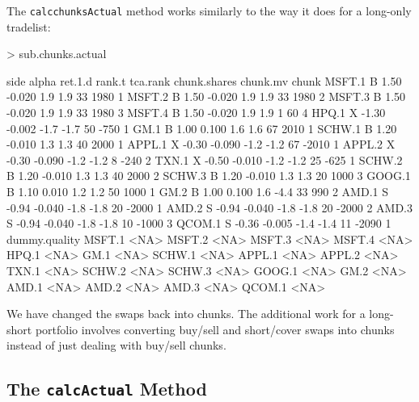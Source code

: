 \documentclass{article}
\begin{document}
The \texttt{calcchunksActual} method works similarly to the way it
does for a long-only tradelist:


\begin{Schunk}
\begin{Sinput}
> sub.chunks.actual
\end{Sinput}
\begin{Soutput}
       side alpha ret.1.d rank.t tca.rank chunk.shares chunk.mv chunk
MSFT.1    B  1.50  -0.020    1.9      1.9           33     1980     1
MSFT.2    B  1.50  -0.020    1.9      1.9           33     1980     2
MSFT.3    B  1.50  -0.020    1.9      1.9           33     1980     3
MSFT.4    B  1.50  -0.020    1.9      1.9            1       60     4
HPQ.1     X -1.30  -0.002   -1.7     -1.7           50     -750     1
GM.1      B  1.00   0.100    1.6      1.6           67     2010     1
SCHW.1    B  1.20  -0.010    1.3      1.3           40     2000     1
APPL.1    X -0.30  -0.090   -1.2     -1.2           67    -2010     1
APPL.2    X -0.30  -0.090   -1.2     -1.2            8     -240     2
TXN.1     X -0.50  -0.010   -1.2     -1.2           25     -625     1
SCHW.2    B  1.20  -0.010    1.3      1.3           40     2000     2
SCHW.3    B  1.20  -0.010    1.3      1.3           20     1000     3
GOOG.1    B  1.10   0.010    1.2      1.2           50     1000     1
GM.2      B  1.00   0.100    1.6     -4.4           33      990     2
AMD.1     S -0.94  -0.040   -1.8     -1.8           20    -2000     1
AMD.2     S -0.94  -0.040   -1.8     -1.8           20    -2000     2
AMD.3     S -0.94  -0.040   -1.8     -1.8           10    -1000     3
QCOM.1    S -0.36  -0.005   -1.4     -1.4           11    -2090     1
       dummy.quality
MSFT.1          <NA>
MSFT.2          <NA>
MSFT.3          <NA>
MSFT.4          <NA>
HPQ.1           <NA>
GM.1            <NA>
SCHW.1          <NA>
APPL.1          <NA>
APPL.2          <NA>
TXN.1           <NA>
SCHW.2          <NA>
SCHW.3          <NA>
GOOG.1          <NA>
GM.2            <NA>
AMD.1           <NA>
AMD.2           <NA>
AMD.3           <NA>
QCOM.1          <NA>
\end{Soutput}
\end{Schunk}

We have changed the swaps back into chunks.  The additional work for a
long-short portfolio involves converting buy/sell and short/cover
swaps into chunks instead of just dealing with buy/sell chunks.

\subsection{The \texttt{calcActual} Method}
\end{document}
